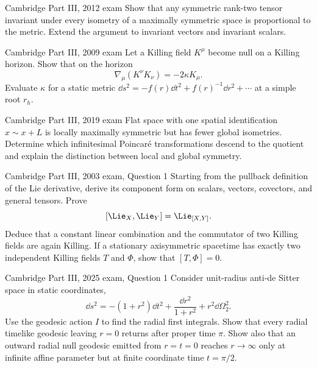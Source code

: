 \begin{exercises}
\begin{exercise}{Cambridge Part III, 2012 exam}
Show that any symmetric rank-two tensor invariant under every isometry of a
maximally symmetric space is proportional to the metric.  Extend the argument
to invariant vectors and invariant scalars.
\end{exercise}

\begin{exercise}{Cambridge Part III, 2009 exam}
Let a Killing field \(K^\mu\) become null on a Killing horizon.  Show that on
the horizon
\[
\nabla_\mu(K^\nu K_\nu)=-2\kappa K_\mu.
\]
Evaluate \(\kappa\) for a static metric
\(\dd s^2=-f(r)\dd t^2+f(r)^{-1}\dd r^2+\cdots\) at a simple root \(r_h\).
\end{exercise}

\begin{exercise}{Cambridge Part III, 2019 exam}
Flat space with one spatial identification \(x\sim x+L\) is locally maximally
symmetric but has fewer global isometries.  Determine which infinitesimal
Poincar\'e transformations descend to the quotient and explain the
distinction between local and global symmetry.
\end{exercise}

\begin{exercise}{Cambridge Part III, 2003 exam, Question 1}
Starting from the pullback definition of the Lie derivative, derive its
component form on scalars, vectors, covectors, and general tensors.  Prove
\[
[\Lie_X,\Lie_Y]=\Lie_{[X,Y]}.
\]
Deduce that a constant linear combination and the commutator of two Killing
fields are again Killing.  If a stationary axisymmetric spacetime has
exactly two independent Killing fields \(T\) and \(\Phi\), show that
\([T,\Phi]=0\).
\end{exercise}

\begin{exercise}{Cambridge Part III, 2025 exam, Question 1}
Consider unit-radius anti-de Sitter space in static coordinates,
\[
\dd s^2=-(1+r^2)\dd t^2+\frac{\dd r^2}{1+r^2}
+r^2\dd\Omega_2^2.
\]
Use the geodesic action \(I\) to find the radial first integrals.  Show that
every radial timelike geodesic leaving \(r=0\) returns after proper time
\(\pi\).  Show also that an outward radial null geodesic emitted from
\(r=t=0\) reaches \(r\to\infty\) only at infinite affine parameter but at
finite coordinate time \(t=\pi/2\).
\end{exercise}



\end{exercises}

